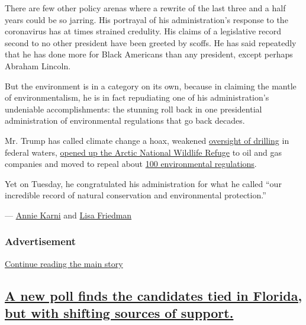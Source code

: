 There are few other policy arenas where a rewrite of the last three and
a half years could be so jarring. His portrayal of his administration's
response to the coronavirus has at times strained credulity. His claims
of a legislative record second to no other president have been greeted
by scoffs. He has said repeatedly that he has done more for Black
Americans than any president, except perhaps Abraham Lincoln.

But the environment is in a category on its own, because in claiming the
mantle of environmentalism, he is in fact repudiating one of his
administration's undeniable accomplishments: the stunning roll back in
one presidential administration of environmental regulations that go
back decades.

Mr. Trump has called climate change a hoax, weakened
\href{https://www.nytimes3xbfgragh.onion/2019/05/02/climate/offshore-drilling-safety-rollback-deepwater-horizon.html}{oversight
of drilling} in federal waters,
\href{https://www.nytimes3xbfgragh.onion/2020/08/17/climate/alaska-oil-drilling-anwr.html}{opened
up the Arctic National Wildlife Refuge} to oil and gas companies and
moved to repeal about
\href{https://www.nytimes3xbfgragh.onion/interactive/2020/climate/trump-environment-rollbacks.html}{100
environmental regulations}.

Yet on Tuesday, he congratulated his administration for what he called
``our incredible record of natural conservation and environmental
protection.''

--- \href{https://www.nytimes3xbfgragh.onion/by/annie-karni}{Annie
Karni} and
\href{https://www.nytimes3xbfgragh.onion/by/lisa-friedman}{Lisa
Friedman}

\hypertarget{advertisement}{%
\subsubsection{Advertisement}\label{advertisement}}

\protect\hyperlink{after-dfp-ad-mid1}{Continue reading the main story}

\hypertarget{a-new-poll-finds-the-candidates-tied-in-florida-but-with-shifting-sources-of-support}{%
\subsection{\texorpdfstring{\protect\hyperlink{a-new-poll-finds-the-candidates-tied-in-florida-but-with-shifting-sources-of-support}{A
new poll finds the candidates tied in Florida, but with shifting sources
of
support.}}{A new poll finds the candidates tied in Florida, but with shifting sources of support.}}\label{a-new-poll-finds-the-candidates-tied-in-florida-but-with-shifting-sources-of-support}}

